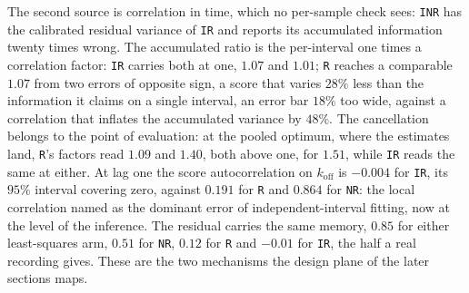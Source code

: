 The second source is correlation in time, which no per-sample check sees: \texttt{INR} has the
calibrated residual variance of \texttt{IR} and reports its accumulated information twenty times
wrong. The accumulated ratio is the per-interval one times a correlation factor: \texttt{IR} carries
both at one, $1.07$ and $1.01$; \texttt{R} reaches a comparable $1.07$ from two errors of opposite
sign, a score that varies $28\%$ less than the information it claims on a single interval, an error
bar $18\%$ too wide, against a correlation that inflates the accumulated variance by $48\%$. The
cancellation belongs to the point of evaluation: at the pooled optimum, where the estimates land,
\texttt{R}'s factors read $1.09$ and $1.40$, both above one, for $1.51$, while \texttt{IR} reads the same at either. At lag one the score autocorrelation
on $k_{\mathrm{off}}$ is $-0.004$ for \texttt{IR}, its $95\%$ interval covering zero, against
$0.191$ for \texttt{R} and $0.864$ for \texttt{NR}: the local correlation \citet{milescu2005maximum}
named as the dominant error of independent-interval fitting, now at the level of the inference. The
residual carries the same memory, $0.85$ for either least-squares arm, $0.51$ for \texttt{NR},
$0.12$ for \texttt{R} and $-0.01$ for \texttt{IR}, the half a real recording gives. These are the two mechanisms the design plane of the later sections maps.
